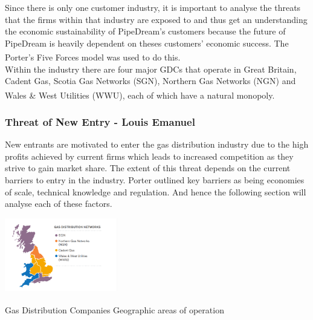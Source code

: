 \documentclass[11pt]{article}		%
\newcommand{\supercite}[1]{\textsuperscript{\cite{#1}}}		%
\begin{document}
        Since there is only one customer industry, it is important to analyse the threats that the firms within that industry are exposed to and thus get an understanding the economic sustainability of PipeDream's customers because the future of PipeDream is heavily dependent on theses customers' economic success.
		The Porter's Five Forces model\supercite{porter2008five} was used to do this.
		\\
		\hspace*{3ex}Within the industry there are four major GDCs that operate in Great Britain, Cadent Gas, Scotia Gas Networks (SGN), Northern Gas Networks (NGN) and Wales \& West Utilities (WWU), each of which have a natural monopoly.\supercite{Gas_Distribution_Industry}  %
			
		\subsubsection[Threat of New Entry]{Threat of New Entry - Louis Emanuel}
		
				New entrants are motivated to enter the gas distribution industry due to the high profits achieved by current firms which leads to increased competition as they strive to gain market share. The extent of this threat depends on the current barriers to entry in the industry. Porter outlined key barriers as being economies of scale, technical knowledge and regulation. And hence the following section will analyse each of these factors.
				
				\begin{floatingfigure}[r]{0.4\textwidth}
				    \centering
			    	\includegraphics[width=0.37\textwidth]{distribution}
				    \caption{Gas Distribution Companies Geographic areas of operation\supercite{sönnichsen_5_2021}}
		    	\label{distrit}
	        	\end{floatingfigure}
	        	
\end{document}
